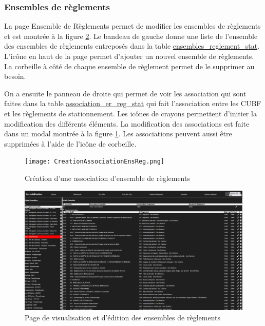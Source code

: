 \subsubsection{Ensembles de règlements}
La page Ensemble de Règlements permet de modifier les ensembles de règlements et est montrée à la figure \ref{fig:page-ensemble-reglements}. Le bandeau de gauche donne une liste de l'ensemble des ensembles de règlements entreposés dans la table \ul{ensembles\_reglement\_stat}. L'icône en haut de la page permet d'ajouter un nouvel ensemble de règlements. La corbeille à côté de chaque ensemble de règlement permet de le supprimer au besoin. \par 
On a ensuite le panneau de droite qui permet de voir les association qui sont faites dans la table \ul{association\_er\_reg\_stat} qui fait l'association entre les \ac{CUBF} et les règlements de stationnement. Les icônes de crayons permettent d'initier la modification des différents éléments. La modification des associations est faite dans un modal montrée à la figure \ref{fig:page-creation-ens-reg}. Les associations peuvent aussi être supprimées à l'aide de l'icône de corbeille.\par
\begin{figure}[!h]
    \centering
    \texttt{[image: CreationAssociationEnsReg.png]}
    \caption{Création d'une association d'ensemble de règlements}
    \label{fig:page-creation-ens-reg}
\end{figure}

\begin{landscape}
    \begin{figure}
        \centering
        \includegraphics[width=1\linewidth]{images/PageEnsembleReglements.png}
        \caption{Page de visualisation et d'édition des ensembles de règlements}
        \label{fig:page-ensemble-reglements}
    \end{figure}
\end{landscape}

